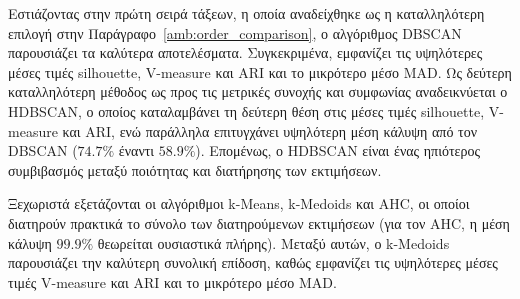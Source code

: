 Εστιάζοντας στην πρώτη σειρά τάξεων, η οποία αναδείχθηκε ως η
καταλληλότερη επιλογή στην Παράγραφο~\ref{amb:order_comparison}, ο
αλγόριθμος DBSCAN παρουσιάζει τα καλύτερα αποτελέσματα. Συγκεκριμένα,
εμφανίζει τις υψηλότερες μέσες τιμές silhouette, V-measure και ARI και το
μικρότερο μέσο MAD. Ως δεύτερη καταλληλότερη μέθοδος ως προς τις μετρικές
συνοχής και συμφωνίας αναδεικνύεται ο HDBSCAN, ο οποίος καταλαμβάνει τη
δεύτερη θέση στις μέσες τιμές silhouette, V-measure και ARI, ενώ παράλληλα
επιτυγχάνει υψηλότερη μέση κάλυψη από τον DBSCAN ($74.7\%$ έναντι
$58.9\%$). Επομένως, ο HDBSCAN είναι ένας ηπιότερος συμβιβασμός μεταξύ
ποιότητας και διατήρησης των εκτιμήσεων.

Ξεχωριστά εξετάζονται οι αλγόριθμοι k-Means, k-Medoids και
AHC, οι οποίοι διατηρούν πρακτικά το σύνολο των διατηρούμενων εκτιμήσεων (για
τον AHC, η μέση κάλυψη $99.9\%$ θεωρείται ουσιαστικά πλήρης). Μεταξύ αυτών, 
ο k-Medoids παρουσιάζει την καλύτερη συνολική επίδοση,
καθώς εμφανίζει τις υψηλότερες μέσες τιμές V-measure και ARI και το
μικρότερο μέσο MAD.
